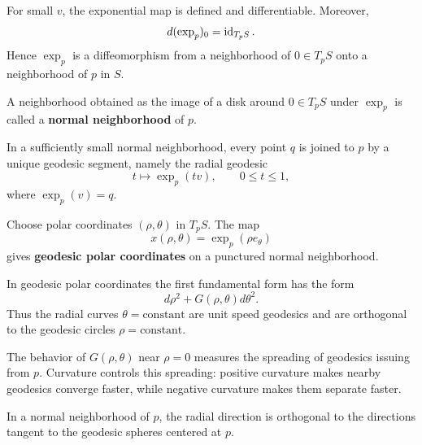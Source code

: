 \documentclass[12pt, oneside]{book}
\begin{document}
\begin{remark}
    For small $v$, the exponential map is defined and differentiable.  Moreover,
    \[
        d(\exp_p)_0=\operatorname{\operatorname{id}}_{T_pS}.
    \]
    Hence $\exp_p$ is a diffeomorphism from a neighborhood of $0\in T_pS$ onto
    a neighborhood of $p$ in $S$.
\end{remark}

\begin{definition}
    A neighborhood obtained as the image of a disk around $0\in T_pS$ under
    $\exp_p$ is called a \textbf{normal neighborhood} of $p$.
\end{definition}

\begin{proposition}
    In a sufficiently small normal neighborhood, every point $q$ is joined to
    $p$ by a unique geodesic segment, namely the radial geodesic
    \[
        t\longmapsto \exp_p(tv),\qquad 0\leq t\leq 1,
    \]
    where $\exp_p(v)=q$.
\end{proposition}

\begin{definition}
    Choose polar coordinates $(\rho,\theta)$ in $T_pS$.  The map
    \[
        x(\rho,\theta)=\exp_p(\rho e_\theta)
    \]
    gives \textbf{geodesic polar coordinates} on a punctured normal
    neighborhood.
\end{definition}

\begin{proposition}
    In geodesic polar coordinates the first fundamental form has the form
    \[
        d\rho^2+G(\rho,\theta)d\theta^2 .
    \]
    Thus the radial curves $\theta=\text{constant}$ are unit speed geodesics
    and are orthogonal to the geodesic circles $\rho=\text{constant}$.
\end{proposition}

\begin{remark}
    The behavior of $G(\rho,\theta)$ near $\rho=0$ measures the spreading of
    geodesics issuing from $p$.  Curvature controls this spreading: positive
    curvature makes nearby geodesics converge faster, while negative curvature
    makes them separate faster.
\end{remark}

\begin{theorem}
    In a normal neighborhood of $p$, the radial direction is orthogonal to the
    directions tangent to the geodesic spheres centered at $p$.
\end{theorem}
\end{document}
